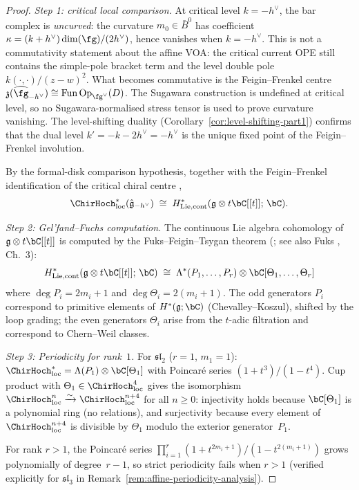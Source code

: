 \begin{proof}
\emph{Step 1: critical local comparison.}
At critical level $k = -h^\vee$, the bar complex is \emph{uncurved}:
the curvature $m_0 \in \bar{B}^0$ has coefficient
$\kappa = (k+h^\vee)\dim(\fg)/(2h^\vee)$, hence vanishes when
$k=-h^\vee$.  This is not a commutativity statement about the affine VOA:
the critical current OPE still contains the simple-pole bracket term and
the level double pole $k(\cdot,\cdot)/(z-w)^2$.  What becomes commutative
is the Feigin--Frenkel centre
$\mathfrak{z}(\widehat{\fg}_{-h^\vee})\cong
\mathrm{Fun}\,\mathrm{Op}_{\fg^\vee}(D)$.  The Sugawara construction is
undefined at critical level, so no Sugawara-normalised stress tensor is used
to prove curvature vanishing.  The level-shifting duality
(Corollary~\ref{cor:level-shifting-part1}) confirms that the dual level
$k' = -k - 2h^\vee = -h^\vee$ is the unique fixed point of the
Feigin--Frenkel involution.

By the formal-disk comparison hypothesis, together with the
Feigin--Frenkel identification of the critical chiral centre
\cite{Feigin-Frenkel},
\[
\ChirHoch_{\mathrm{loc}}^*(\hat{\mathfrak{g}}_{-h^\vee}) \;\cong\;
H^*_{\mathrm{Lie,cont}}(\mathfrak{g} \otimes t\bC[[t]];\, \bC).
\]

\emph{Step 2: Gel'fand--Fuchs computation.}
The continuous Lie algebra cohomology of $\mathfrak{g} \otimes t\bC[[t]]$
is computed by the Fuks--Feigin--Tsygan theorem (\cite{FT87}; see also
Fuks \cite{Fuks86}, Ch.~3):
\[
H^*_{\mathrm{Lie,cont}}(\mathfrak{g} \otimes t\bC[[t]];\, \bC) \;\cong\;
\Lambda^*(P_1, \ldots, P_r) \otimes \bC[\Theta_1, \ldots, \Theta_r]
\]
where $\deg P_i = 2m_i + 1$ and $\deg \Theta_i = 2(m_i + 1)$.
The odd generators $P_i$ correspond to primitive elements of
$H^*(\mathfrak{g}; \bC)$ (Chevalley--Koszul), shifted by the loop grading;
the even generators $\Theta_i$ arise from the $t$-adic filtration and
correspond to Chern--Weil classes.

\emph{Step 3: Periodicity for rank~$1$.}
For $\mathfrak{sl}_2$ ($r = 1$, $m_1 = 1$):
$\ChirHoch_{\mathrm{loc}}^* = \Lambda(P_1) \otimes \bC[\Theta_1]$
with Poincar\'e series $(1 + t^3)/(1 - t^4)$. Cup product with
$\Theta_1 \in \ChirHoch_{\mathrm{loc}}^4$ gives the isomorphism
$\ChirHoch_{\mathrm{loc}}^n \xrightarrow{\sim}
\ChirHoch_{\mathrm{loc}}^{n+4}$
for all $n \geq 0$: injectivity holds because $\bC[\Theta_1]$ is a
polynomial ring (no relations), and surjectivity because every element of
$\ChirHoch_{\mathrm{loc}}^{n+4}$ is divisible by $\Theta_1$ modulo
the exterior generator~$P_1$.

For rank $r > 1$, the Poincar\'e series
$\prod_{i=1}^r (1 + t^{2m_i+1})/(1-t^{2(m_i+1)})$ grows
polynomially of degree~$r-1$, so strict periodicity fails when
$r > 1$ (verified explicitly for $\mathfrak{sl}_3$ in
Remark~\ref{rem:affine-periodicity-analysis}).
\end{proof}

